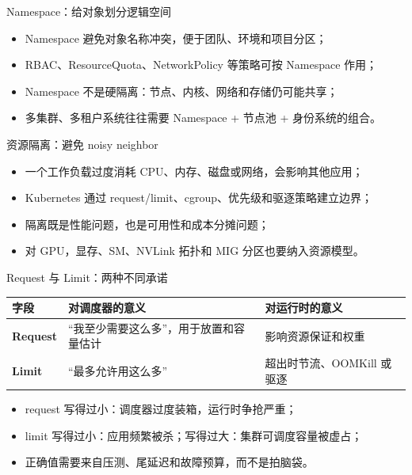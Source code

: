 \documentclass[UTF8,fontset=none,aspectratio=169,10pt]{beamer}
\begin{document}

\begin{frame}{Namespace：给对象划分逻辑空间}
\begin{itemize}
  \item Namespace 避免对象名称冲突，便于团队、环境和项目分区；
  \item RBAC、ResourceQuota、NetworkPolicy 等策略可按 Namespace 作用；
  \item Namespace 不是硬隔离：节点、内核、网络和存储仍可能共享；
  \item 多集群、多租户系统往往需要 Namespace + 节点池 + 身份系统的组合。
\end{itemize}
\vfill
{}
\end{frame}

\begin{frame}{资源隔离：避免 noisy neighbor}
\begin{itemize}
  \item 一个工作负载过度消耗 CPU、内存、磁盘或网络，会影响其他应用；
  \item Kubernetes 通过 request/limit、cgroup、优先级和驱逐策略建立边界；
  \item 隔离既是性能问题，也是可用性和成本分摊问题；
  \item 对 GPU，显存、SM、NVLink 拓扑和 MIG 分区也要纳入资源模型。
\end{itemize}
\end{frame}

\begin{frame}{Request 与 Limit：两种不同承诺}
\begin{tabularx}{\linewidth}{>{\bfseries}p{2.8cm}XX}
\toprule
字段 & 对调度器的意义 & 对运行时的意义 \\
\midrule
Request & “我至少需要这么多”，用于放置和容量估计 & 影响资源保证和权重 \\
Limit & “最多允许用这么多” & 超出时节流、OOMKill 或驱逐 \\
\bottomrule
\end{tabularx}
\vfill
\begin{itemize}
  \item request 写得过小：调度器过度装箱，运行时争抢严重；
  \item limit 写得过小：应用频繁被杀；写得过大：集群可调度容量被虚占；
  \item 正确值需要来自压测、尾延迟和故障预算，而不是拍脑袋。
\end{itemize}
\end{frame}
\end{document}
